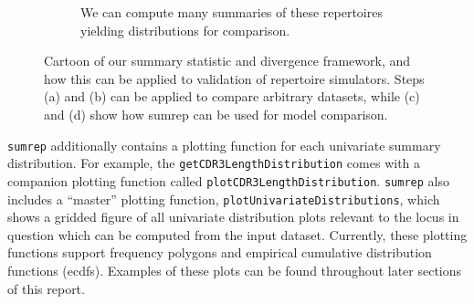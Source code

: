 \documentclass{article}
\begin{document}
\begin{figure}
\begin{subfigure}[c]{0.48\linewidth}
\begin{center}
		\end{center}
		\caption{We can compute many summaries of these repertoires yielding distributions for comparison.}
		\label{fig:DataSimSummary}
    \end{subfigure}
    \caption{Cartoon of our summary statistic and divergence framework, and how this can be applied to validation of repertoire simulators. Steps (a) and (b) can be applied to compare arbitrary datasets, while (c) and (d) show how sumrep can be used for model comparison.}
    \label{fig:SummaryFramework}
\end{figure}

\texttt{sumrep} additionally contains a plotting function for each univariate summary distribution.
For example, the \texttt{getCDR3LengthDistribution} comes with a companion plotting function called \texttt{plotCDR3LengthDistribution}.
\texttt{sumrep} also includes a ``master'' plotting function, \texttt{plotUnivariateDistributions}, which shows a gridded figure of all univariate distribution plots relevant to the locus in question which can be computed from the input dataset.
Currently, these plotting functions support frequency polygons and empirical cumulative distribution functions (ecdfs).
Examples of these plots can be found throughout later sections of this report.
\end{document}
